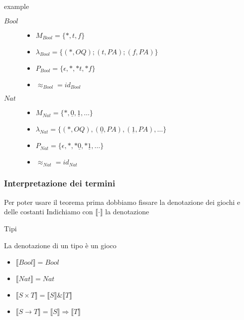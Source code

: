 \documentclass{beamer}
\begin{document}
\begin{frame}
	
		
	\begin{block}{example}
		\begin{description}
			\item[$Bool$] \begin{itemize}
			              	\item $M_{Bool}=\{*,t,f\}$
			              	\item $\lambda_{Bool}= \{ (*,OQ) ; (t,PA) ; (f,PA) \}$
			              	\item $P_{Bool}= \{ \epsilon , * ,*t, *f \}$
			              	\item $\approx_{Bool} = id_{Bool}$
			              \end{itemize}

			\item[$Nat$] \begin{itemize}
			              	\item $M_{Nat}=\{ * , \underline{0} , \underline{1} , \dots \}$
			              	\item $\lambda_{Nat}= \{ (*,OQ) , (\underline{0},PA) , (\underline{1},PA) , \dots \}$
			              	\item $P_{Nat}= \{ \epsilon , * , *\underline{0} , *\underline{1} , \dots \}$
											\item $\approx_{Nat} = id_{Nat}$
			              \end{itemize}
		\end{description}

	\end{block}	
	
\end{frame}



\begin{frame}
	
	\frametitle{Interpretazione dei termini}
	
	Per poter usare il teorema prima dobbiamo fissare la denotazione dei giochi e delle costanti
	Indichiamo con $\llbracket \cdot \rrbracket$ la denotazione
	
	\begin{block}{Tipi}
		
		La denotazione di un tipo è un gioco
		
		\begin{itemize}
			\item $\llbracket Bool \rrbracket = Bool$
			\item $\llbracket Nat \rrbracket = Nat$
			\item $\llbracket S \times T \rrbracket = \llbracket S \rrbracket \& \llbracket T \rrbracket$
			\item $\llbracket S \rightarrow T \rrbracket = \llbracket S \rrbracket \Rightarrow \llbracket T \rrbracket$
		\end{itemize}
	\end{block}
	
	
	
\end{frame}
\end{document}
